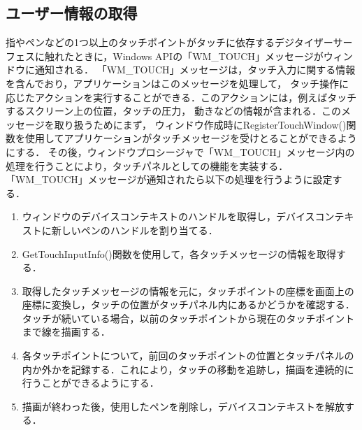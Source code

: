 \subsection{ユーザー情報の取得}
指やペンなどの1つ以上のタッチポイントがタッチに依存するデジタイザーサーフェスに触れたときに，Windows APIの「WM\_TOUCH」メッセージがウィンドウに通知される\cite{Win32API-reference}．
「WM\_TOUCH」メッセージは，タッチ入力に関する情報を含んでおり，アプリケーションはこのメッセージを処理して，
タッチ操作に応じたアクションを実行することができる．このアクションには，例えばタッチするスクリーン上の位置，タッチの圧力，
動きなどの情報が含まれる．このメッセージを取り扱うためにまず，
ウィンドウ作成時にRegisterTouchWindow()関数を使用してアプリケーションがタッチメッセージを受けとることができるようにする．
その後，ウィンドウプロシージャで「WM\_TOUCH」メッセージ内の処理を行うことにより，タッチパネルとしての機能を実装する．
「WM\_TOUCH」メッセージが通知されたら以下の処理を行うように設定する．
\begin{enumerate}[leftmargin=*]
  \item ウィンドウのデバイスコンテキストのハンドルを取得し，デバイスコンテキストに新しいペンのハンドルを割り当てる．
  \item GetTouchInputInfo()関数を使用して，各タッチメッセージの情報を取得する．
  \item 取得したタッチメッセージの情報を元に，タッチポイントの座標を画面上の座標に変換し，タッチの位置がタッチパネル内にあるかどうかを確認する．タッチが続いている場合，以前のタッチポイントから現在のタッチポイントまで線を描画する．
  \item 各タッチポイントについて，前回のタッチポイントの位置とタッチパネルの内か外かを記録する．これにより，タッチの移動を追跡し，描画を連続的に行うことができるようにする．
  \item 描画が終わった後，使用したペンを削除し，デバイスコンテキストを解放する．
\end{enumerate}

